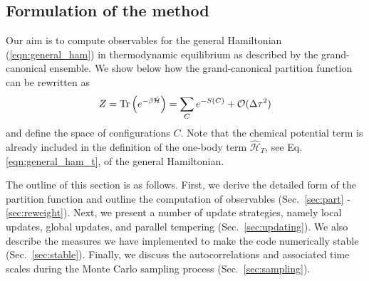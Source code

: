 


\subsection{Formulation of the method}  \label{sec:method}
Our aim is to compute observables  for the general Hamiltonian  (\ref{eqn:general_ham}) in
 thermodynamic equilibrium as described by the grand-canonical ensemble.
We show below  how the grand-canonical partition function can be rewritten as 
\begin{equation}
Z = \mathop{\mathrm{Tr}}{\left(e^{-\beta \hat{\mathcal{H}} }\right)}
= \sum_{C} e^{-S(C) } + \mathcal{O}(\Delta\tau^{2})
\end{equation}
and define the space of configurations  $C$.
Note that the chemical potential term is already included in the definition of the one-body term ${\mathcal{\hat{H}}_{T}}$, see Eq. \eqref{eqn:general_ham_t}, of the general Hamiltonian.  

The outline of this section is as follows. First, we derive the detailed form of the partition function and outline the computation of observables (Sec.~\ref{sec:part} - \ref{sec:reweight}). 
Next, we present a number of update strategies, namely local updates, global updates, and parallel tempering (Sec.~\ref{sec:updating}). 
We also describe the measures we have implemented to make the code numerically stable (Sec.~\ref{sec:stable}). Finally, we discuss the autocorrelations and associated time scales during the 
Monte Carlo sampling process (Sec.~\ref{sec:sampling}). 

